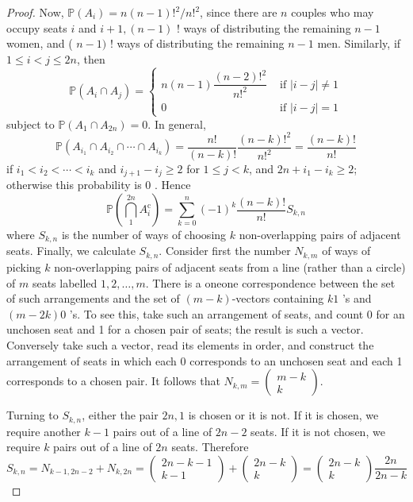 \documentclass[11pt,singlecolumn, openany, citestyle=authoryear]{elegantbook}
\begin{document}
\begin{CJK}{UTF8}{gbsn}
\begin{proof}
    Now, $\mathbb{P}\left(A_i\right)=n(n-1) !^2 / n !^2$, since there are $n$ couples who may occupy seats $i$ and $i+1,(n-1)$ ! ways of distributing the remaining $n-1$ women, and ( $n-1)$ ! ways of distributing the remaining $n-1$ men. Similarly, if $1 \leq i<j \leq 2 n$, then
    $$
    \mathbb{P}\left(A_i \cap A_j\right)= 
    \begin{cases}n(n-1) 
        \dfrac{(n-2) !^2}{n !^2} & \text { if }|i-j| \neq 1 \\
        0 & \text { if }|i-j|=1
    \end{cases}
    $$
    subject to $\mathbb{P}\left(A_1 \cap A_{2 n}\right)=0$. In general,
    $$
    \mathbb{P}\left(A_{i_1} \cap A_{i_2} \cap \cdots \cap A_{i_k}\right)
    =\frac{n !}{(n-k) !} \frac{(n-k) !^2}{n !^2}=\frac{(n-k) !}{n !}
    $$
    if $i_1<i_2<\cdots<i_k$ and $i_{j+1}-i_j \geq 2$ for $1 \leq j<k$, and $2 n+i_1-i_k \geq 2$; otherwise this probability is 0 . Hence
    $$
    \mathbb{P}\left(\bigcap_1^{2 n} A_i^{\mathrm{c}}\right)=\sum_{k=0}^n(-1)^k \frac{(n-k) !}{n !} S_{k, n}
    $$
    where $S_{k, n}$ is the number of ways of choosing $k$ non-overlapping pairs of adjacent seats.
    Finally, we calculate $S_{k, n}$. Consider first the number $N_{k, m}$ of ways of picking $k$ non-overlapping pairs of adjacent seats from a line (rather than a circle) of $m$ seats labelled $1,2, \ldots, m$. There is a oneone correspondence between the set of such arrangements and the set of $(m-k)$-vectors containing
    $k 1$ 's and $(m-2 k) 0$ 's. To see this, take such an arrangement of seats, and count 0 for an unchosen seat and 1 for a chosen pair of seats; the result is such a vector. Conversely take such a vector, read its elements in order, and construct the arrangement of seats in which each 0 corresponds to an unchosen seat and each 1 corresponds to a chosen pair. It follows that 
    $N_{k, m}=\left(\begin{array}{c}m-k \\ k\end{array}\right)$.

Turning to $S_{k, n}$, either the pair $2 n, 1$ is chosen or it is not. If it is chosen, we require another $k-1$ pairs out of a line of $2 n-2$ seats. If it is not chosen, we require $k$ pairs out of a line of $2 n$ seats. Therefore
$$
S_{k, n}=N_{k-1,2 n-2}+N_{k, 2 n}=\left(\begin{array}{c}
2 n-k-1 \\
k-1
\end{array}\right)+\left(\begin{array}{c}
2 n-k \\
k
\end{array}\right)=\left(\begin{array}{c}
2 n-k \\
k
\end{array}\right) \frac{2 n}{2 n-k}
$$
\end{proof}


\end{CJK}
\end{document}
